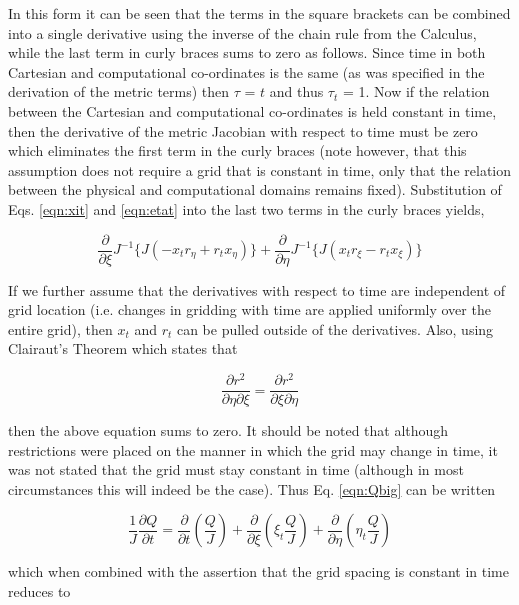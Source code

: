 	In this form it can be seen that the terms in the square brackets can be combined into a single derivative
using the inverse of the chain rule from the Calculus, while the last term in curly braces sums to zero as follows.  
Since time in both Cartesian and computational co-ordinates is the same (as was specified in the derivation of the 
metric terms) then $\tau$ = $t$ and thus $\tau_t$ = 1.  Now if the
relation between the Cartesian and computational co-ordinates is held constant in time, then the derivative of the metric 
Jacobian with respect to time must be zero which eliminates the first term in the curly braces (note however, that 
this assumption does not require a grid that is constant in time, only that the relation between the physical and 
computational domains remains fixed).  Substitution of Eqs. \ref{eqn:xit} and \ref{eqn:etat} into the last two terms 
in the curly braces yields,

\begin{displaymath}
	\frac{\partial}{\partial \xi}J^{-1}\Big\{J(-x_t r_\eta + r_t x_\eta)\Big\} 
	+ \frac{\partial}{\partial \eta}J^{-1}\Big\{J(x_t r_\xi - r_t x_\xi)\Big\}
\end{displaymath}

	If we further assume that the derivatives with respect to time are independent of grid location (i.e. changes
in gridding with time are applied uniformly over the entire grid), then $x_t$ and $r_t$
can be pulled outside of the derivatives.  Also, using Clairaut's Theorem which states that

\begin{equation}
	\frac{\partial r^2}{\partial \eta \partial \xi} = \frac{\partial r^2}{\partial \xi \partial \eta}
\label{eqn:clairaut}
\end{equation}

	then the above equation sums to zero.  It should be noted that although restrictions
were placed on the manner in which the grid may change in time, it was not stated that the grid must stay constant in time
(although in most circumstances this will indeed be the case).  Thus Eq. \ref{eqn:Qbig} can be written

\begin{displaymath}
	\frac{1}{J}\frac{\partial Q}{\partial t} = \frac{\partial}{\partial t}(\frac{Q}{J}) 
	+ \frac{\partial}{\partial \xi}(\xi_t \frac{Q}{J}) + \frac{\partial}{\partial \eta}(\eta_t \frac{Q}{J})
\end{displaymath}  

	which when combined with the assertion that the grid spacing is constant in time reduces to 

